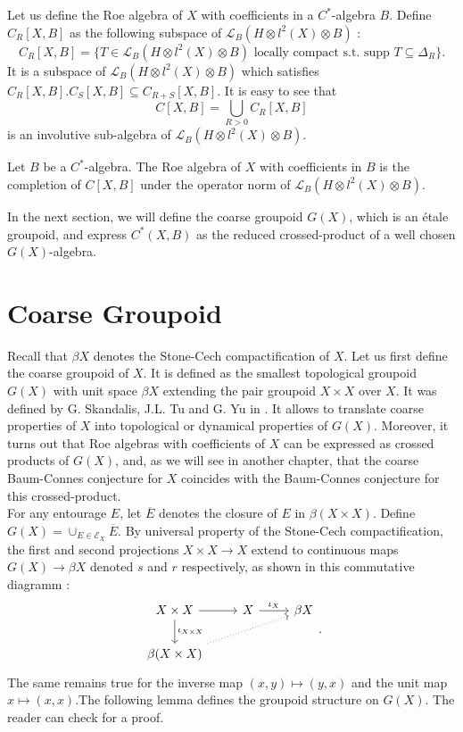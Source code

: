 Let us define the Roe algebra of $X$ with coefficients in a $C^*$-algebra $B$. Define $C_R[X,B]$ as the following subspace of $\mathcal L_B(H\otimes l^2(X)\otimes B)$ :
\[C_R[X,B] = \{T\in \mathcal L_B(H\otimes l^2(X)\otimes B) \text{ locally compact  s.t. supp }T\subseteq \Delta_R \}.\]
It is a subspace of $\mathcal L_B(H\otimes l^2(X)\otimes B)$ which satisfies $C_R[X,B].C_S[X,B]\subseteq C_{R+S}[X,B]$. It is easy to see that 
\[C[X,B] = \bigcup_{R>0} C_R[X,B]\] 
is an involutive sub-algebra of $\mathcal L_B(H\otimes l^2(X)\otimes B)$.

\begin{definition}
Let $B$ be a $C^*$-algebra. The Roe algebra of $X$ with coefficients in $B$ is the completion of $C[X,B]$ under the operator norm of $\mathcal L_B(H\otimes l^2(X)\otimes B)$. 
\end{definition} 

In the next section, we will define the coarse groupoid $G(X)$, which is an étale groupoid, and express $C^*(X,B)$ as the reduced crossed-product of a well chosen $G(X)$-algebra.


\section{Coarse Groupoid}  %


Recall that $\beta X$ denotes the Stone-Cech compactification of $X$. Let us first define the coarse groupoid of $X$. It is defined as the smallest topological groupoid $G(X)$ with unit space $\beta X$ extending the pair groupoid $X\times X$ over $X$. It was defined by G. Skandalis, J.L. Tu and G. Yu in \cite{SkTuYU}. It allows to translate coarse properties of $X$ into topological or dynamical properties of $G(X)$. Moreover, it turns out that Roe algebras with coefficients of $X$ can be expressed as crossed products of $G(X)$, and, as we will see in another chapter, that the coarse Baum-Connes conjecture for $X$ coincides with the Baum-Connes conjecture for this crossed-product.  \\

For any entourage $E$, let $\overline E$ denotes the closure of $E$ in $\beta (X\times X)$. Define $G(X) = \cup_{E\in\mathcal E_X} \overline E$. By universal property of the Stone-Cech compactification, the first and second projections $X\times X\rightarrow X$ extend to continuous maps $G(X)\rightarrow \beta X$ denoted $s$ and $r$ respectively, as shown in this commutative diagramm :  
\[\begin{tikzcd}
X\times X \arrow{r}\arrow{d}{\iota_{X\times X}} &  X \arrow{r}{\iota_X} & \beta X \\
\beta (X\times X) \arrow[dotted]{urr} & & 
\end{tikzcd}.\]
The same remains true for the inverse map $(x,y)\mapsto (y,x)$ and the unit map $x\mapsto (x,x)$.The following lemma defines the groupoid structure on $G(X)$. The reader can check \cite{RoeCoarse} for a proof.

